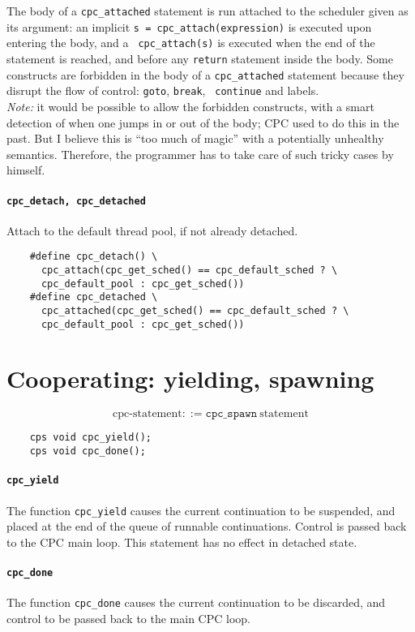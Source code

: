 \documentclass[a4paper]{report}
\begin{document}
The body of a {\tt cpc\_attached} statement is run attached to the
scheduler given as its argument: an implicit {\tt s =
cpc\_attach(expression)} is executed upon entering the body, and a {\tt
cpc\_attach(s)} is executed when the end of the statement is reached,
and before any {\tt return} statement inside the body.  Some constructs
are forbidden in the body of a {\tt cpc\_attached} statement because
they disrupt the flow of control: {\tt goto}, {\tt break}, {\tt
continue} and labels.\\
{\em Note:\/} it would be possible to allow the forbidden constructs,
with a smart detection of when one jumps in or out of the body; CPC used
to do this in the past.  But I believe this is ``too much of magic''
with a potentially unhealthy semantics.  Therefore, the programmer has
to take care of such tricky cases by himself.

\paragraph{\tt cpc\_detach, cpc\_detached} Attach to the default thread
pool, if not already detached.
\begin{verbatim}
    #define cpc_detach() \
      cpc_attach(cpc_get_sched() == cpc_default_sched ? \
      cpc_default_pool : cpc_get_sched())
    #define cpc_detached \
      cpc_attached(cpc_get_sched() == cpc_default_sched ? \
      cpc_default_pool : cpc_get_sched())
\end{verbatim}
\section{Cooperating: yielding, spawning} \label{sec:cooperating}

\[ \mbox{cpc-statement} ::=
   \mathtt{cpc\_spawn}\ \mbox{statement} \]
\begin{verbatim}
    cps void cpc_yield();
    cps void cpc_done();
\end{verbatim}

\paragraph{\tt cpc\_yield} The function {\tt cpc\_yield} causes the
current continuation to be suspended, and placed at the end of the
queue of runnable continuations.  Control is passed back to the CPC
main loop.  This statement has no effect in detached state.

\paragraph{\tt cpc\_done} The function {\tt cpc\_done} causes the
current continuation to be discarded, and control to be passed back to
the main CPC loop.
\end{document}
